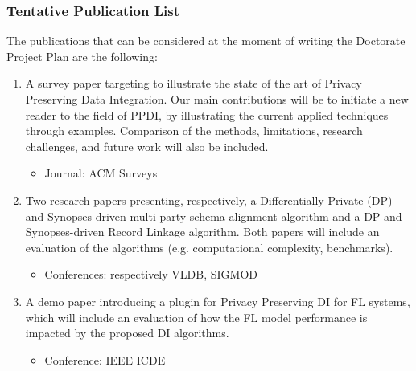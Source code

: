 \documentclass[12pt]{article}
\begin{document}
\subsubsection{Tentative Publication List}
The publications that can be considered at the moment of writing the Doctorate Project Plan are the
following:
\begin{enumerate}
   \item A survey paper targeting to illustrate the state of the art of Privacy Preserving Data Integration. Our
   main contributions will be to initiate a new reader to the field of PPDI,
   by illustrating the current applied techniques through examples. Comparison of the methods,
   limitations, research challenges, and future work will also be included.
   \begin{itemize}
      \item Journal: ACM Surveys
   \end{itemize}

   \item Two research papers presenting, respectively, a Differentially Private (DP) and Synopses-driven multi-party schema 
   alignment algorithm and a DP and Synopses-driven Record Linkage algorithm. Both papers will include an evaluation of the algorithms (e.g. computational complexity, benchmarks).
   \begin{itemize}
      \item Conferences: respectively VLDB, SIGMOD
   \end{itemize}
   \item A demo paper introducing a plugin for Privacy Preserving DI for FL systems, which will include an evaluation of how 
   the FL model performance is impacted by the proposed DI algorithms.
   \begin{itemize}
      \item Conference: IEEE ICDE
   \end{itemize}
\end{enumerate}


\end{document}
